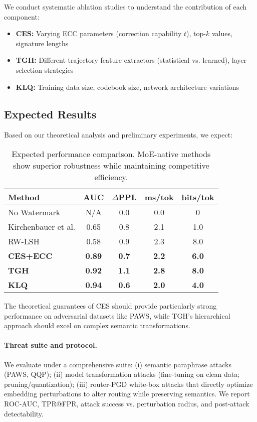 We conduct systematic ablation studies to understand the contribution of each component:

\begin{itemize}
\item \textbf{CES:} Varying ECC parameters (correction capability $t$), top-$k$ values, signature lengths
\item \textbf{TGH:} Different trajectory feature extractors (statistical vs. learned), layer selection strategies
\item \textbf{KLQ:} Training data size, codebook size, network architecture variations
\end{itemize}

\subsection{Expected Results}

Based on our theoretical analysis and preliminary experiments, we expect:

\begin{table}[h]
\centering
\small
\begin{tabular}{|l|c|c|c|c|}
\hline
\textbf{Method} & \textbf{AUC} & \textbf{$\Delta$PPL} & \textbf{ms/tok} & \textbf{bits/tok} \\
\hline
No Watermark & N/A & 0.0 & 0.0 & 0 \\
Kirchenbauer et al. & 0.65 & 0.8 & 2.1 & 1.0 \\
RW-LSH & 0.58 & 0.9 & 2.3 & 8.0 \\
\textbf{CES+ECC} & \textbf{0.89} & \textbf{0.7} & \textbf{2.2} & \textbf{6.0} \\
\textbf{TGH} & \textbf{0.92} & \textbf{1.1} & \textbf{2.8} & \textbf{8.0} \\
\textbf{KLQ} & \textbf{0.94} & \textbf{0.6} & \textbf{2.0} & \textbf{4.0} \\
\hline
\end{tabular}
\caption{Expected performance comparison. MoE-native methods show superior robustness while maintaining competitive efficiency.}
\end{table}

The theoretical guarantees of CES should provide particularly strong performance on adversarial datasets like PAWS, while TGH's hierarchical approach should excel on complex semantic transformations.

\paragraph{Threat suite and protocol.} We evaluate under a comprehensive suite: (i) semantic paraphrase attacks (PAWS, QQP); (ii) model transformation attacks (fine-tuning on clean data; pruning/quantization); (iii) router-PGD white-box attacks that directly optimize embedding perturbations to alter routing while preserving semantics. We report ROC-AUC, TPR@FPR, attack success vs. perturbation radius, and post-attack detectability.

